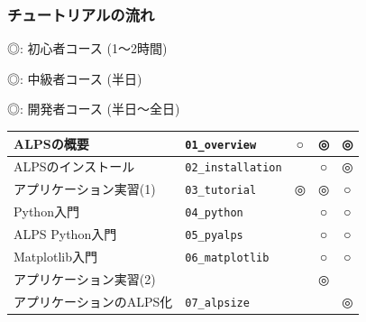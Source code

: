 \begin{frame}[t,fragile]
  \frametitle{チュートリアルの流れ}
             {\footnotesize\color{red} ◎}: 初心者コース (1〜2時間)

             {\footnotesize\color{blue} ◎}: 中級者コース (半日)

             {\footnotesize\color{green} ◎}: 開発者コース (半日〜全日) \\[1em]
             
  \begin{tabular}{|l|l|c|c|c|}
        \hline
        ALPSの概要 & {\tt 01\_overview} & {\footnotesize\color{red} ○} & {\footnotesize\color{blue} ◎} & {\footnotesize\color{green} ◎} \\
        \hline
        ALPSのインストール & {\tt 02\_installation} & {\footnotesize\color{red} } & {\footnotesize\color{blue} ○} & {\footnotesize\color{green} ◎} \\
        \hline
        アプリケーション実習(1) & {\tt 03\_tutorial} & {\footnotesize\color{red} ◎} & {\footnotesize\color{blue} ◎} & {\footnotesize\color{green} ○} \\
        \hline
        Python入門 & {\tt 04\_python} & {\footnotesize\color{red}} & {\footnotesize\color{blue} ○} & {\footnotesize\color{green} ○} \\
        \hline
        ALPS Python入門 & {\tt 05\_pyalps} & {\footnotesize\color{red} } & {\footnotesize\color{blue} ○} & {\footnotesize\color{green} ○} \\
        \hline
        Matplotlib入門 & {\tt 06\_matplotlib} & {\footnotesize\color{red} } & {\footnotesize\color{blue} ○} & {\footnotesize\color{green} ○} \\
        \hline
        アプリケーション実習(2) & & {\footnotesize\color{red} } & {\footnotesize\color{blue} ◎} & {\footnotesize\color{green} } \\
        \hline
        アプリケーションのALPS化 & {\tt 07\_alpsize} & {\footnotesize\color{red} } & {\footnotesize\color{blue} } & {\footnotesize\color{green} ◎} \\
        \hline
  \end{tabular}
\end{frame}

